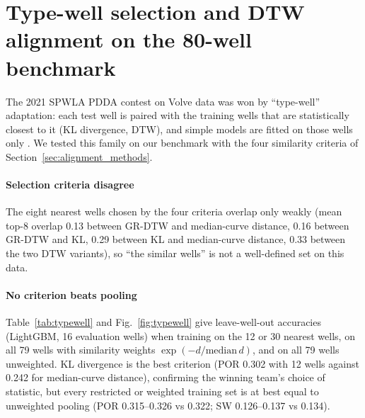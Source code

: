 \documentclass[preprint,12pt]{elsarticle}
\begin{document}
\section{Type-well selection and DTW alignment on the 80-well benchmark}
\label{sec:typewell}

The 2021 SPWLA PDDA contest on Volve data was won by ``type-well'' adaptation: each test well is paired with the training wells that are statistically closest to it (KL divergence, DTW), and simple models are fitted on those wells only \cite{fu2024contest}. We tested this family on our benchmark with the four similarity criteria of Section~\ref{sec:alignment_methods}.

\paragraph{Selection criteria disagree} The eight nearest wells chosen by the four criteria overlap only weakly (mean top-8 overlap 0.13 between GR-DTW and median-curve distance, 0.16 between GR-DTW and KL, 0.29 between KL and median-curve distance, 0.33 between the two DTW variants), so ``the similar wells'' is not a well-defined set on this data.

\paragraph{No criterion beats pooling} Table~\ref{tab:typewell} and Fig.~\ref{fig:typewell} give leave-well-out accuracies (LightGBM, 16 evaluation wells) when training on the 12 or 30 nearest wells, on all 79 wells with similarity weights $\exp(-d/\mathrm{median}\,d)$, and on all 79 wells unweighted. KL divergence is the best criterion (POR 0.302 with 12 wells against 0.242 for median-curve distance), confirming the winning team's choice of statistic, but every restricted or weighted training set is at best equal to unweighted pooling (POR 0.315--0.326 vs 0.322; SW 0.126--0.137 vs 0.134).
\end{document}
